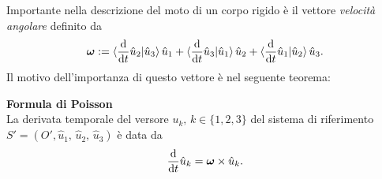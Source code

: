     Importante nella descrizione del moto di un corpo rigido è il vettore \emph{velocità angolare} definito da
    \begin{equation}
        \boldsymbol{\omega} := \braket{\frac{\mathrm{d}}{\mathrm{d}t} \hat{u}_2 |\hat{u}_3}\hat{u}_1+\braket{\frac{\mathrm{d}}{\mathrm{d}t} \hat{u}_3 |\hat{u}_1}\hat{u}_2+\braket{\frac{\mathrm{d}}{\mathrm{d}t} \hat{u}_1 |\hat{u}_2}\hat{u}_3.
    \end{equation}
    Il motivo dell'importanza di questo vettore è nel seguente teorema:
    \begin{theorem}
        \textbf{Formula di Poisson}\\
        La derivata temporale del versore $u_k,\,k \in \{1,2,3\}$ del sistema di riferimento $S' = (O',\hat{u}_1,\,\hat{u}_2,\,\hat{u}_3)$ è data da
        \begin{equation}
            \frac{\mathrm{d}}{\mathrm{d}t} \hat{u}_k = \boldsymbol{\omega} \times \hat{u}_k.
        \end{equation}
    \end{theorem}
